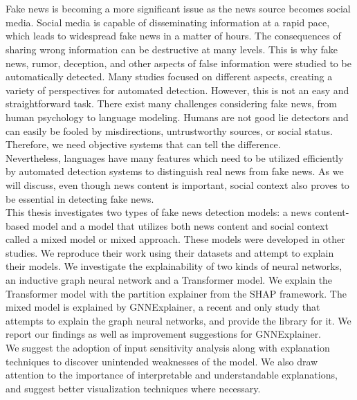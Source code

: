 \chapter{\abstractname}


Fake news is becoming a more significant issue as the news source becomes social media. Social media is capable of disseminating information at a rapid pace, which leads to widespread fake news in a matter of hours. The consequences of sharing wrong information can be destructive at many levels. This is why fake news, rumor, deception, and other aspects of false information were studied to be automatically detected. Many studies focused on different aspects, creating a variety of perspectives for automated detection. However, this is not an easy and straightforward task. There exist many challenges considering fake news, from human psychology to language modeling. Humans are not good lie detectors and can easily be fooled by misdirections, untrustworthy sources, or social status. Therefore, we need objective systems that can tell the difference.\\
Nevertheless, languages have many features which need to be utilized efficiently by automated detection systems to distinguish real news from fake news. As we will discuss, even though news content is important, social context also proves to be essential in detecting fake news.\\
This thesis investigates two types of fake news detection models: a news content-based model and a model that utilizes both news content and social context called a mixed model or mixed approach.  These models were developed in other studies. We reproduce their work using their datasets and attempt to explain their models. We investigate the explainability of two kinds of neural networks, an inductive graph neural network and a Transformer model. We explain the Transformer model with the partition explainer from the SHAP framework. The mixed model is explained by GNNExplainer, a recent and only study that attempts to explain the graph neural networks, and provide the library for it. We report our findings as well as improvement suggestions for GNNExplainer.\\
We suggest the adoption of input sensitivity analysis along with explanation techniques to discover unintended weaknesses of  the model. We also draw attention to the importance of interpretable and understandable explanations, and suggest better visualization techniques where necessary.
